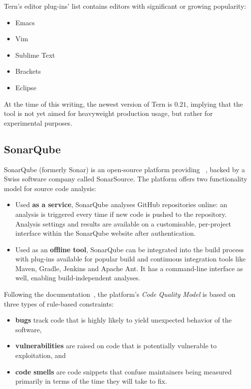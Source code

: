 Tern's editor plug-ins' list contains editors with significant or growing popularity:

\begin{itemize}
\item Emacs
\item Vim
\item Sublime Text
\item Brackets
\item Eclipse
\end{itemize}

At the time of this writing, the newest version of Tern is $0.21$, implying that the tool is not yet aimed for heavyweight production usage, but rather for experimental purposes.


\subsection{SonarQube}

SonarQube (formerly Sonar) is an open-source platform providing ~\cite{sonarqube-website}, backed by a Swiss software company called SonarSource. The platform offers two functionality model for source code analysis:

\begin{itemize}
\item Used \textbf{as a service}, SonarQube analyses GitHub repositories online: an analysis is triggered every time if new code is pushed to the repository. Analysis settings and results are available on a customisable, per-project interface within the SonarQube website after authentication.
\item Used as an \textbf{offline tool}, SonarQube can be integrated into the build process with plug-ins available for popular build and continuous integration tools like Maven, Gradle, Jenkins and Apache Ant. It has a command-line interface as well, enabling build-independent analyses.
\end{itemize}

Following the documentation~\cite{sonarqube-website}, the platform's \emph{Code Quality Model} is based on three types of rule-based constraints:

\begin{itemize}
\item \textbf{bugs} track code that is highly likely to yield unexpected behavior of the software,
\item \textbf{vulnerabilities} are raised on code that is potentially vulnerable to exploitation, and
\item \textbf{code smells} are code snippets that confuse maintainers being measured primarily in terms of the time they will take to fix.
\end{itemize}

